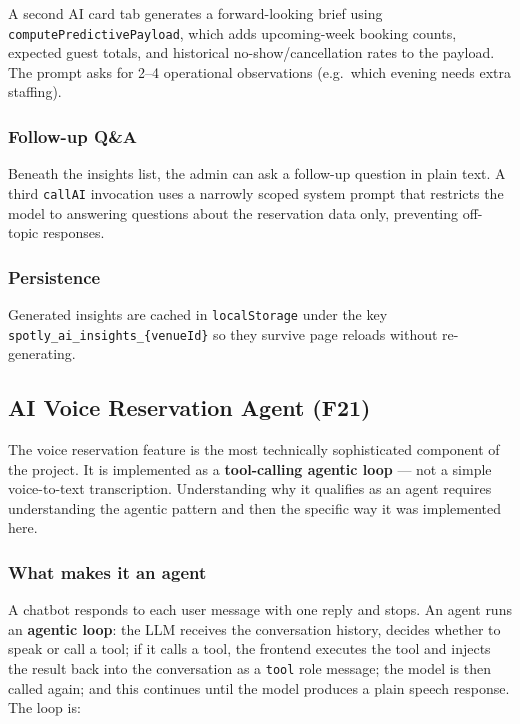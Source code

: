 \documentclass[12pt,a4paper,oneside]{report}
\begin{document}
A second AI card tab generates a forward-looking brief using
\texttt{computePredictivePayload}, which adds upcoming-week booking counts,
expected guest totals, and historical no-show/cancellation rates to the
payload. The prompt asks for 2--4 operational observations (e.g.\ which
evening needs extra staffing).

\subsubsection{Follow-up Q\&A}

Beneath the insights list, the admin can ask a follow-up question in plain
text. A third \texttt{callAI} invocation uses a narrowly scoped system
prompt that restricts the model to answering questions about the reservation
data only, preventing off-topic responses.

\subsubsection{Persistence}

Generated insights are cached in \texttt{localStorage} under the key
\texttt{spotly\_ai\_insights\_\{venueId\}} so they survive page reloads
without re-generating.

\subsection{AI Voice Reservation Agent (F21)}

The voice reservation feature is the most technically sophisticated component
of the project. It is implemented as a \textbf{tool-calling agentic loop}
--- not a simple voice-to-text transcription. Understanding why it qualifies
as an agent requires understanding the agentic pattern and then the specific
way it was implemented here.

\subsubsection{What makes it an agent}

A chatbot responds to each user message with one reply and stops. An agent
runs an \textbf{agentic loop}: the LLM receives the conversation history,
decides whether to speak or call a tool; if it calls a tool, the frontend
executes the tool and injects the result back into the conversation as a
\texttt{tool} role message; the model is then called again; and this
continues until the model produces a plain speech response. The loop is:
\end{document}
